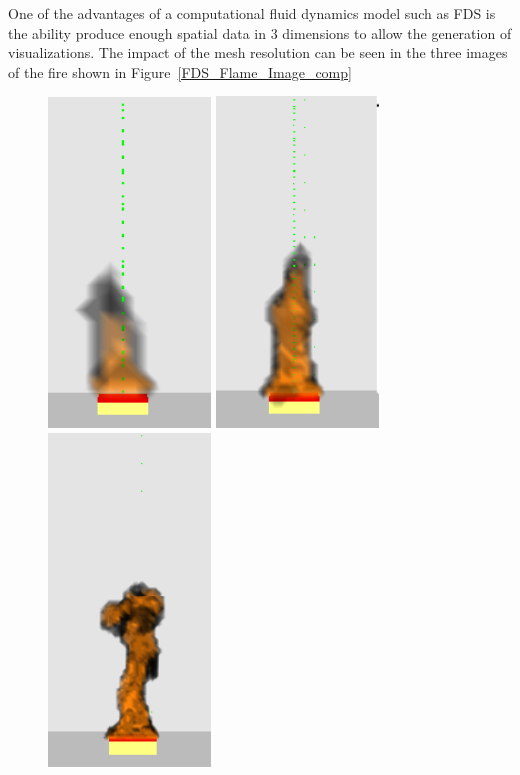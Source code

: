 \documentclass[twoside]{uocthesis}
\begin{document}
One of the advantages of a computational fluid dynamics model such as FDS is the ability produce enough spatial data in 3 dimensions to allow the generation of visualizations.  The impact of the mesh resolution can be seen in the three images of the fire shown in Figure~\ref{FDS_Flame_Image_comp}

\begin{figure}[ht!]
  \centering
  \includegraphics[width=1.7in]{../Figures/NG_80kW_GBWall_2D_RI=05_0601crop}
  \includegraphics[width=1.7in]{../Figures/NG_80kW_GBWall_2D_RI=10_0601crop}
  \includegraphics[width=1.7in]{../Figures/NG_80kW_GBWall_2D_RI=20_0601crop}\\

\end{figure}
\end{document}
